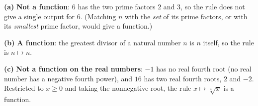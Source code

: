 \textbf{(a)} \textbf{Not a function}: $6$ has the two prime factors $2$ and $3$, so the rule does not give a single output for $6$. (Matching $n$ with the \emph{set} of its prime factors, or with its \emph{smallest} prime factor, would give a function.)

\textbf{(b)} \textbf{A function}: the greatest divisor of a natural number $n$ is $n$ itself, so the rule is $n\mapsto n$.

\textbf{(c)} \textbf{Not a function on the real numbers}: $-1$ has no real fourth root (no real number has a negative fourth power), and $16$ has two real fourth roots, $2$ and $-2$. Restricted to $x\ge0$ and taking the nonnegative root, the rule $x\mapsto\sqrt[4]{x}$ is a function.
